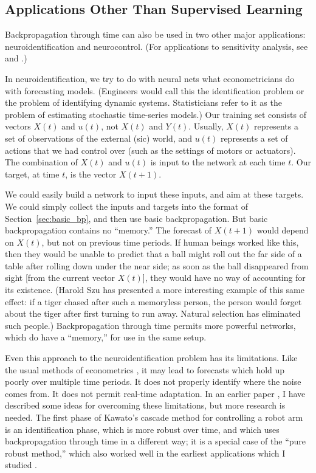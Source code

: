 \documentclass[journal]{IEEEtran} %
\begin{document}
\subsection{Applications Other Than Supervised Learning}
Backpropagation through time can also be used in two other major applications: neuroidentification and neurocontrol. (For applications to sensitivity analysis, see \cite{Werbos:1982} and \cite{Werbos:1988}.)

In neuroidentification, we try to do with neural nets what econometricians do with forecasting models. (Engineers would call this the identification problem or the problem of identifying dynamic systems. Statisticians refer to it as the problem of estimating stochastic time-series models.) Our training set consists of vectors $X(t)$ and $u(t)$, not $X(t)$ and $Y(t)$. Usually, $X(t)$ represents a set of observations of the external (sic) world, and $u(t)$ represents a set of actions that we had control over (such as the settings of motors or actuators). The combination of $X(t)$ and $u(t)$ is input to the network at each time $t$. Our target, at time $t$, is the vector $X(t+1)$.

We could easily build a network to input these inputs, and aim at these targets. We could simply collect the inputs and targets into the format of Section~\ref{sec:basic_bp}, and then use basic backpropagation. But basic backpropagation contains no ``memory.'' The forecast of $X(t+1)$ would depend on $X(t)$, but not on previous time periods. If human beings worked like this, then they would be unable to predict that a ball might roll out the far side of a table after rolling down under the near side; as soon as the ball disappeared from sight [from the current vector $X(t)$], they would have no way of accounting for its existence. (Harold Szu has presented a more interesting example of this same effect: if a tiger chased after such a memoryless person, the person would forget about the tiger after first turning to run away. Natural selection has eliminated such people.) Backpropagation through time permits more powerful networks, which do have a ``memory,'' for use in the same setup.

Even this approach to the neuroidentification problem has its limitations. Like the usual methods of econometrics \cite{Werbos:1988}, it may lead to forecasts which hold up poorly over multiple time periods. It does not properly identify where the noise comes from. It does not permit real-time adaptation. In an earlier paper \cite{Werbos:1987c}, I have described some ideas for overcoming these limitations, but more research is needed. The first phase of Kawato's cascade method \cite{Kawato:1990} for controlling a robot arm is an identification phase, which is more robust over time, and which uses backpropagation through time in a different way; it is a special case of the ``pure robust method,'' which also worked well in the earliest applications which I studied \cite{Werbos:1974, Werbos:1987c}.
\end{document}
